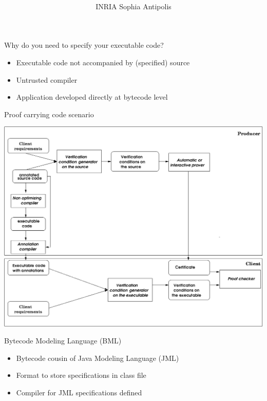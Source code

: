 \documentclass[final,nocolorBG,a4,mobius,nototal,pdf,slideColor]{prosper}
\title{\vspace*{-1em}\Blue{Bytecode Modeling Language}\bigskip\\
}
\subtitle{}
\author{  \Blue{Marieke Huisman}\\
  INRIA Sophia Antipolis}
\begin{document}
\maketitle

\begin{slide}{Why do you need to specify your executable code?}
\begin{itemize}
\item Executable code not accompanied by (specified) source
\item Untrusted compiler
\item Application developed directly at bytecode level
\end{itemize}
\end{slide}

\begin{slide}{Proof carrying code scenario}
\vspace*{-1em}
\begin{center}
\includegraphics[height=.9\textheight]{PPO.eps}
\end{center}
\end{slide}

\begin{slide}{Bytecode Modeling Language (BML)}
\begin{itemize}
\item Bytecode cousin of Java Modeling Language (JML)
\item Format to store specifications in class file
\item Compiler for JML specifications defined
\end{itemize}
\end{slide}
\end{document}
